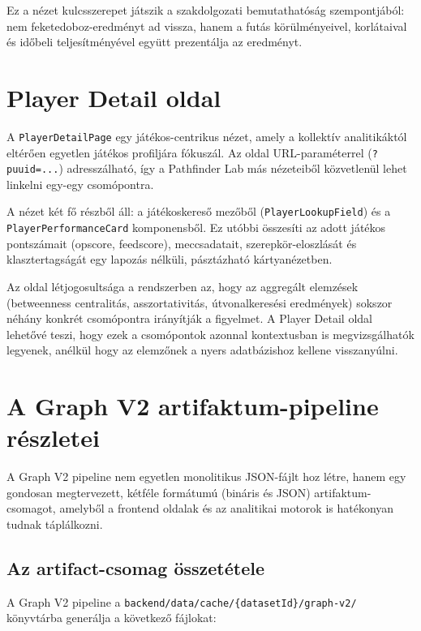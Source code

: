 Ez a nézet kulcsszerepet játszik a szakdolgozati bemutathatóság szempontjából: nem feketedoboz-eredményt ad vissza, hanem a futás körülményeivel, korlátaival és időbeli teljesítményével együtt prezentálja az eredményt.

\section{Player Detail oldal}

A \texttt{PlayerDetailPage} egy játékos-centrikus nézet, amely a kollektív analitikáktól eltérően egyetlen játékos profiljára fókuszál. Az oldal URL-paraméterrel (\texttt{?puuid=...}) adresszálható, így a Pathfinder Lab más nézeteiből közvetlenül lehet linkelni egy-egy csomópontra.

A nézet két fő részből áll: a játékoskereső mezőből (\texttt{PlayerLookupField}) és a \texttt{PlayerPerformanceCard} komponensből. Ez utóbbi összesíti az adott játékos pontszámait (opscore, feedscore), meccsadatait, szerepkör-eloszlását és klasztertagságát egy lapozás nélküli, pásztázható kártyanézetben.

Az oldal létjogosultsága a rendszerben az, hogy az aggregált elemzések (betweenness centralitás, asszortativitás, útvonalkeresési eredmények) sokszor néhány konkrét csomópontra irányítják a figyelmet. A Player Detail oldal lehetővé teszi, hogy ezek a csomópontok azonnal kontextusban is megvizsgálhatók legyenek, anélkül hogy az elemzőnek a nyers adatbázishoz kellene visszanyúlni.

\section{A Graph V2 artifaktum-pipeline részletei}
\label{sec:graph_v2_artifact}

A Graph V2 pipeline nem egyetlen monolitikus JSON-fájlt hoz létre, hanem egy gondosan megtervezett, kétféle formátumú (bináris és JSON) artifaktum-csomagot, amelyből a frontend oldalak és az analitikai motorok is hatékonyan tudnak táplálkozni.

\subsection{Az artifact-csomag összetétele}

A Graph V2 pipeline a \texttt{backend/data/cache/\{datasetId\}/graph-v2/} könyvtárba generálja a következő fájlokat:

